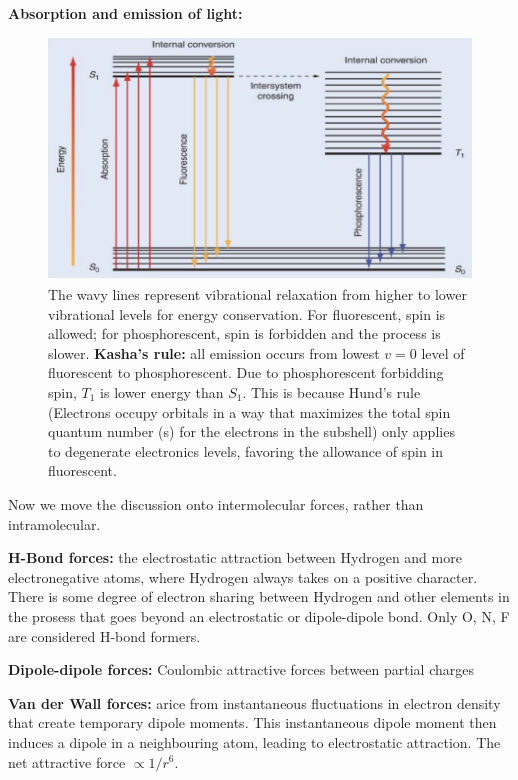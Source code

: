 \documentclass[11pt,fleqn]{book}
\begin{document}
\textbf{Absorption and emission of light: }
\begin{figure}[h!]
	\begin{center}
		\includegraphics[width=0.75\linewidth]{Pictures/p.png}
	\end{center}
	\caption{The wavy lines represent vibrational relaxation from higher to lower vibrational levels for energy conservation. For fluorescent, spin is allowed; for phosphorescent, spin is forbidden and the process is slower. \textbf{Kasha's rule: }all emission occurs from lowest $v=0$ level of fluorescent to phosphorescent. Due to phosphorescent forbidding spin, $T_1$ is lower energy than $S_1$. This is because Hund's rule (Electrons occupy orbitals in a way that maximizes the total spin quantum number (s) for the electrons in the subshell) only applies to degenerate electronics levels, favoring the allowance of spin in fluorescent.
	}
\end{figure}

Now we move the discussion onto intermolecular forces, rather than intramolecular.

\textbf{H-Bond forces: }the electrostatic attraction between Hydrogen and more electronegative atoms, where Hydrogen always takes on a positive character. There is some degree of electron sharing between Hydrogen and other elements in the prosess that goes beyond an electrostatic or dipole-dipole bond. Only O, N, F are considered H-bond formers.

\textbf{Dipole-dipole forces: }Coulombic attractive forces between partial charges

\textbf{Van der Wall forces: }arice from instantaneous fluctuations in electron density that create temporary dipole moments. This instantaneous dipole moment then induces a dipole in a neighbouring atom, leading to electrostatic attraction. The net attractive force $\propto 1/r^6$.
\end{document}
